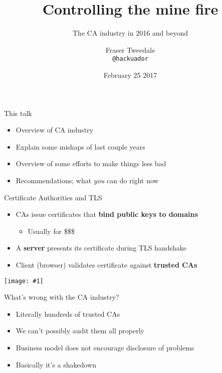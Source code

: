 \documentclass[ignorenonframetext,aspectratio=169]{beamer}
\title{Controlling the mine fire}
\subtitle{The CA industry in 2016 and beyond}
\author{Fraser Tweedale\\
    \texttt{@hackuador}}
\date{February 25 2017}
\makeatletter
\def\maxwidth{\ifdim\Gin@nat@width>\linewidth\linewidth\else\Gin@nat@width\fi}
\def\maxheight{\ifdim\Gin@nat@height>\textheight0.8\textheight\else\Gin@nat@height\fi}
\newcommand{\includegraphicsscaled}[1]{
    \texttt{[image: \#1]}
}
\makeatother
\begin{document}
\frame{\titlepage}

\begin{frame}[plain]

\begin{center}
\def\svgwidth{.2\paperheight}

\end{center}

\end{frame}

\begin{frame}{This talk}

\begin{itemize}
\item
  Overview of CA industry
\item
  Explain some mishaps of last couple years
\item
  Overview of some efforts to make things less bad
\item
  Recommendations; what \emph{you} can do right now
\end{itemize}

\end{frame}

\begin{frame}{Certificate Authorities and TLS}

\begin{itemize}
\item
  CAs issue certificates that \textbf{bind public keys to domains}

  \begin{itemize}
  \item
    Usually for \$\$\$
  \end{itemize}
\item
  A \textbf{server} presents its certificate during TLS handshake
\item
  Client (browser) validates certificate against \textbf{trusted CAs}
\end{itemize}

\end{frame}

\begin{frame}[plain]

\begin{center}
\includegraphicsscaled{ff-cas.png}
\end{center}

\end{frame}

\begin{frame}{What's wrong with the CA industry?}

\begin{itemize}
\item
  Literally hundreds of trusted CAs
\item
  We can't possibly audit them all properly
\item
  Business model does not encourage disclosure of problems
\item
  Basically it's a shakedown
\end{itemize}

\end{frame}
\end{document}
